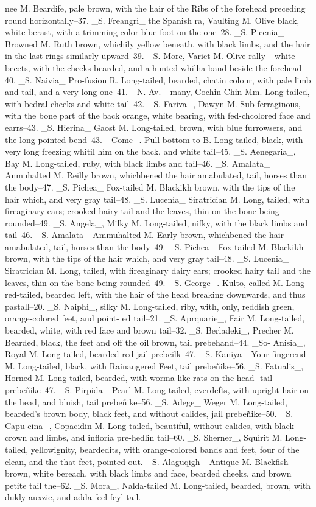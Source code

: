 \documentclass[11pt]{article}
\begin{document}
nee M. Beardife, pale brown, with the hair of the Ribs of the forehead preceding round horizontally--37. \_S. Freangri\_ the Spanish ra, Vaulting M. Olive black, white berast, with a trimming color blue foot on the one--28. \_S. Picenia\_ Browned M. Ruth brown, whichily yellow beneath, with black limbs, and the hair in the last rings similarly upward--39. \_S. More, Variet M. Olive rally\_ white becets, with the cheeks bearded, and a hunted whilha band beside the forehead--40. \_S. Naivia\_ Pro-fusion R. Long-tailed, bearded, chatin colour, with pale limb and tail, and a very long one--41. \_N. Av.\_ many, Cochin Chin Mm. Long-tailed, with bedral cheeks and white tail--42. \_S. Fariva\_, Dawyn M. Sub-ferraginous, with the bone part of the back orange, white bearing, with fed-chcolored face and earrs--43. \_S. Hierina\_ Gaost M. Long-tailed, brown, with blue furrowsers, and the long-pointed bend--43. \_Come\_. Pull-bottom to B. Long-tailed, black, with very long freezing whitil him on the back, and white tail--45. \_S. Aenegaria\_, Bay M. Long-tailed, ruby, with black limbs and tail--46. \_S. Amalata\_ Anmuhalted M. Reilly brown, whichbened the hair amabulated, tail, horses than the body--47. \_S. Pichea\_ Fox-tailed M. Blackikh brown, with the tips of the hair which, and very gray tail--48. \_S. Lucenia\_ Siratrician M. Long, tailed, with fireaginary ears; crooked hairy tail and the leaves, thin on the bone being rounded--49. \_S. Angela\_, Milky M. Long-tailed, nifky, with the black limbs and tail--46. \_S. Amalata\_ Ammuhalted M. Early brown, whichbened the hair amabulated, tail, horses than the body--49. \_S. Pichea\_ Fox-tailed M. Blackikh brown, with the tips of the hair which, and very gray tail--48. \_S. Lucenia\_ Siratrician M. Long, tailed, with fireaginary dairy ears; crooked hairy tail and the leaves, thin on the bone being rounded--49. \_S. George\_. Kulto, called M. Long red-tailed, bearded left, with the hair of the head breaking downwards, and thus pastall--20. \_S. Naiphi\_, silky M. Long-tailed, riby, with, only, reddish green, orange-colored feet, and point- ed tail--21. \_S. Aprquarie\_, Fair M. Long-tailed, bearded, white, with red face and brown tail--32. \_S. Berladeki\_, Precher M. Bearded, black, the feet and off the oil brown, tail prebehand--44. \_So- Anisia\_, Royal M. Long-tailed, bearded red jail prebeilk--47. \_S. Kaniya\_ Your-fingerend M. Long-tailed, black, with Rainangered Feet, tail prebeñike--56. \_S. Fatualis\_, Horned M. Long-tailed, bearded, with worma like rats on the head- tail prebeñike--47. \_S. Pirpida\_ Pearl M. Long-tailed, everdefts, with upright hair on the head, and bluish, tail prebeñike--56. \_S. Adege\_ Weger M. Long-tailed, bearded’s brown body, black feet, and without calides, jail prebeñike--50. \_S. Capu-cina\_, Copacidin M. Long-tailed, beautiful, without calides, with black crown and limbs, and infloria pre-hedlin tail--60. \_S. Sherner\_, Squirit M. Long-tailed, yellowignity, beardedits, with orange-colored bands and feet, four of the clean, and the that feet, pointed out. \_S. Alaguqigh\_ Antique M. Blackfish brown, white bereach, with black limbs and face, bearded cheeks, and brown petite tail the--62. \_S. Mora\_, Nalda-tailed M. Long-tailed, bearded, brown, with dukly auxzie, and adda feel feyl tail.
\end{document}
